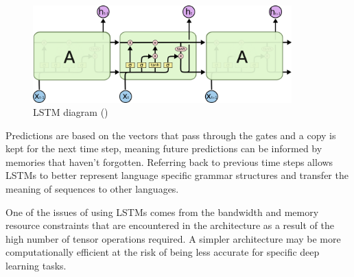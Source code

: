 \begin{figure}[ht!]
\centering
\includegraphics[width=0.89\textwidth]{media/literature/machine_learning/ml_rnn_lstm.png}
\caption[Diagram of Long Short Term Memory]{\acrfull{LSTM} diagram (\cite{colah_lstm_2019})}
\label{fig:rnn_lstm}
\end{figure}

Predictions are based on the vectors that pass through the gates and a copy is kept for the next time step, meaning future predictions can be informed by memories that haven't forgotten. Referring back to previous time steps allows \acrshort{LSTM}s to better represent language specific grammar structures and transfer the meaning of sequences to other languages.


One of the issues of using \acrshort{LSTM}s comes from the bandwidth and memory resource constraints that are encountered in the architecture as a result of the high number of tensor operations required. A simpler architecture may be more computationally efficient at the risk of being less accurate for specific deep learning tasks.








